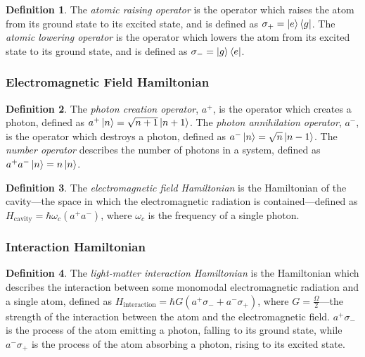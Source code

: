 \documentclass{article}
\theoremstyle{definition}
\newtheorem{definition}{Definition}[section]
\begin{document}
\begin{definition}
    The \emph{atomic raising operator} is the operator which raises the atom from its ground state to its excited state, and is defined as $\sigma_{+} = \ket{e}\bra{g}$. The \emph{atomic lowering operator} is the operator which lowers the atom from its excited state to its ground state, and is defined as $\sigma_{-} = \ket{g}\bra{e}$.
\end{definition}

\subsubsection{Electromagnetic Field Hamiltonian}
\begin{definition}
    The \emph{photon creation operator}, $a^{+}$, is the operator which creates a photon, defined as $a^{+}\ket{n} = \sqrt{n + 1}\ket{n + 1}$. The \emph{photon annihilation operator}, $a^{-}$, is the operator which destroys a photon, defined as $a^{-}\ket{n} = \sqrt{n}\ket{n-1}$. The \emph{number operator} describes the number of photons in a system, defined as $a^{+}a^{-}\ket{n} = n\ket{n}$.
\end{definition}

\begin{definition}
    The \emph{electromagnetic field Hamiltonian} is the Hamiltonian of the cavity---the space in which the electromagnetic radiation is contained---defined as $H_{\text{cavity}} = \hbar \omega_{c} (a^{+}a^{-})$, where $\omega_{c}$ is the frequency of a single photon.
\end{definition}

\subsubsection{Interaction Hamiltonian}
\begin{definition}
    The \emph{light-matter interaction Hamiltonian} is the Hamiltonian which describes the interaction between some monomodal electromagnetic radiation and a single atom, defined as $H_{\text{interaction}} = \hbar G (a^{+}\sigma_{-} + a^{-}\sigma_{+})$, where $G = \frac{\Omega}{2}$---the strength of the interaction between the atom and the electromagnetic field. $a^{+}\sigma_{-}$ is the process of the atom emitting a photon, falling to its ground state, while $a^{-}\sigma_{+}$ is the process of the atom absorbing a photon, rising to its excited state.
\end{definition}
\end{document}
